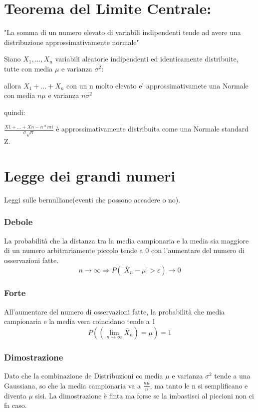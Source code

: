 \documentclass{book}
\begin{document}
\section{Teorema del Limite Centrale:}

"La somma di un numero elevato di variabili indipendenti tende ad avere una distribuzione approssimativamente normale"

Siano $X_{1},...,X_{n}$ variabili aleatorie indipendenti ed identicamente distribuite, 
tutte con media $\mu$ e varianza $\sigma^2$:

allora $X_{1}+...+X_{n}$ con un n molto elevato e' approssimativamete una Normale con
\newline
media $n\mu$ e varianza $n\sigma^2$

quindi:

$\frac{X1+...+Xn - n*mi}{\sigma \sqrt{n}}$ è approssimativamente distribuita come una Normale standard Z.

\section{Legge dei grandi numeri}
Leggi sulle bernulliane(eventi che possono accadere o no).
\subsubsection{Debole}
La probabilità che la distanza tra la media campionaria e la media sia maggiore di un numero arbitrariamente piccolo
tende a 0 con l'aumentare del numero di osservazioni fatte.
\begin{equation}
	n \to \infty \Longrightarrow P(\mid \bar{X}_{n} - \mu \mid > \varepsilon) \to 0 
\end{equation}
\subsubsection{Forte}
All'aumentare del numero di osservazioni fatte, la probabilità che media campionaria e la media vera coincidano tende a 1
\begin{equation}
	P((\lim_{n \to \infty} \bar{X}_{n}) = \mu) = 1
\end{equation}
\subsubsection{Dimostrazione}
Dato che la combinazione de Distribuzioni co media $\mu$
e varianza $\sigma^2$ tende a una Gaussiana, so che la media campionaria  va a
$\frac{n\mu}{n}$, ma tanto le n si semplificano e diventa $\mu$ sisi.
\newline
La dimostrazione è finta ma forse se la imbastisci al piccioni non ci fa caso.
\end{document}
